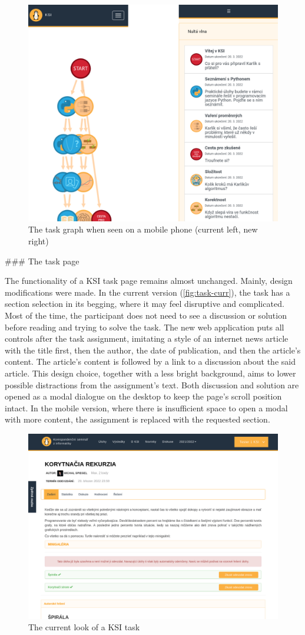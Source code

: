 \documentclass[
  digital, %
  oneside, %
  lof,     %
  nolot,     %
]{fithesis4}
\begin{document}
{\begin{figure}
\includegraphics[width=.5\textwidth]{assets/img/graph-mobile}
\caption{The task graph when seen on a mobile phone (current left, new right)}
\label{fig:graph-mobile}
\end{figure}

### The task page

The functionality of a KSI task page remains almost unchanged. Mainly, design modifications were made. In the current version (\autoref{fig:task-curr}), the task has a section selection in its begging, where it may feel disruptive and complicated. Most of the time, the participant does not need to see a discussion or solution before reading and trying to solve the task. The new web application puts all controls after the task assignment, imitating a style of an internet news article with the title first, then the author, the date of publication, and then the article's content. The article's content is followed by a link to a discussion about the said article. This design choice, together with a less bright background, aims to lower possible distractions from the assignment's text. Both discussion and solution are opened as a modal dialogue on the desktop to keep the page's scroll position intact. In the mobile version, where there is insufficient space to open a modal with more content, the assignment is replaced with the requested section.

\begin{figure}
\includegraphics[width=.9\textwidth]{assets/img/task-curr}
\caption{The current look of a KSI task}
\label{fig:task-curr}
\end{figure}

}
\end{document}
